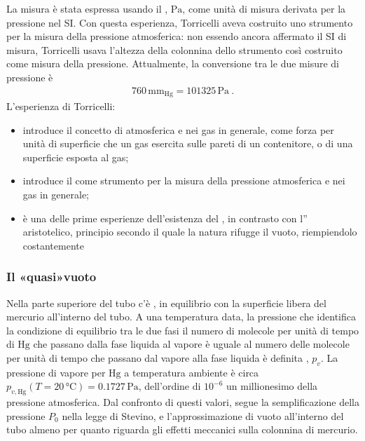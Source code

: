 \documentclass[letterpaper,10pt,italian]{jupyterBook}
\begin{document}
\sphinxAtStartPar
La misura è stata espressa usando il , \(\text{Pa}\), come unità di misura derivata per la pressione nel SI. Con questa esperienza, Torricelli aveva costruito uno strumento per la misura della pressione atmosferica: non essendo ancora affermato il SI di misura, Torricelli usava l’altezza della colonnina dello strumento così costruito come misura della pressione. Attualmente, la conversione tra le due misure di pressione è
\begin{equation*}
\begin{split}760 \, \text{mm}_{\text{Hg}} = 101325 \, \text{Pa} \ .\end{split}
\end{equation*}
\sphinxAtStartPar
L’esperienza di Torricelli:
\begin{itemize}
\item {} 
\sphinxAtStartPar
introduce il concetto di  atmosferica e nei gas in generale, come forza per unità di superficie che un gas esercita sulle pareti di un contenitore, o di una superficie esposta al gas;

\item {} 
\sphinxAtStartPar
introduce il  come strumento per la misura della pressione atmosferica e nei gas in generale;

\item {} 
\sphinxAtStartPar
è una delle prime esperienze dell’esistenza del , in contrasto con l” aristotelico, principio secondo il quale la natura rifugge il vuoto, riempiendolo costantemente

\end{itemize}
\subsubsection*{Il «quasi»\sphinxhyphen{}vuoto}

\sphinxAtStartPar
Nella parte superiore del tubo c’è , in equilibrio con la superficie libera del mercurio all’interno del tubo. A una temperatura data, la pressione che identifica la condizione di equilibrio tra le due fasi \sphinxhyphen{} il numero di molecole per unità di tempo di \(\text{Hg}\) che passano dalla fase liquida al vapore è uguale al numero delle molecole per unità di tempo che passano dal vapore alla fase liquida \sphinxhyphen{} è definita {\hyperref[\detokenize{ch/thermodynamics/humid-air:physics-hs-thermodynamics-matter-humid-air-vapor-pressure}]{}}, \(p_v\). La pressione di vapore per \(\text{Hg}\) a temperatura ambiente è circa \(p_{v, \text{Hg}}(T=20 \, \text{°C}) = 0.1727 \, \text{Pa}\), dell’ordine di \(10^{-6}\) \sphinxhyphen{} un millionesimo \sphinxhyphen{} della pressione atmosferica. Dal confronto di questi valori, segue la semplificazione della pressione \(P_0\) nella legge di Stevino, e l’approssimazione di vuoto all’interno del tubo almeno per quanto riguarda gli effetti meccanici sulla colonnina di mercurio.
\end{document}
